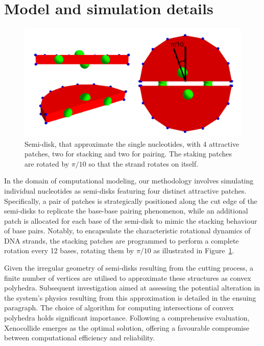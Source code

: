 \documentclass[aip,jcp, amsmath, amssymb, reprint]{revtex4-1}
\begin{document}
\section{\label{sec:level1}Model and simulation details}
\begin{figure}[h!]
\includegraphics[width=1\linewidth]{rota.png}
\caption{\label{fig:rota} Semi-disk, that approximate the single nucleotides, with 4 attractive patches, two for stacking and two for pairing. The staking patches are rotated by $\pi/10$ so that the strand rotates on itself.}
\end{figure}
In the domain of computational modeling, our methodology involves simulating individual nucleotides as semi-disks
featuring four distinct attractive patches. Specifically, a pair of patches is strategically positioned along the cut
edge of the semi-disks to replicate the base-base pairing phenomenon, while an additional patch is allocated for each
base of the semi-disk to mimic the stacking behaviour of base pairs. Notably, to encapsulate the characteristic
rotational dynamics of DNA strands, the stacking patches are programmed to perform a complete rotation every 12 bases,
rotating them by $\pi/10$ as illustrated in Figure~\ref{fig:rota}. 


Given the irregular geometry of semi-disks resulting from the cutting process, a finite number of vertices are utilised
to approximate these structures as convex polyhedra. Subsequent investigation aimed at assessing the potential
alteration in the system's physics resulting from this approximation is detailed in the ensuing paragraph. The choice of
algorithm for computing intersections of convex polyhedra holds significant importance. Following a comprehensive
evaluation, Xenocollide\cite{libccd} emerges as the optimal solution, offering a favourable compromise between
computational efficiency and reliability.\\
\end{document}
